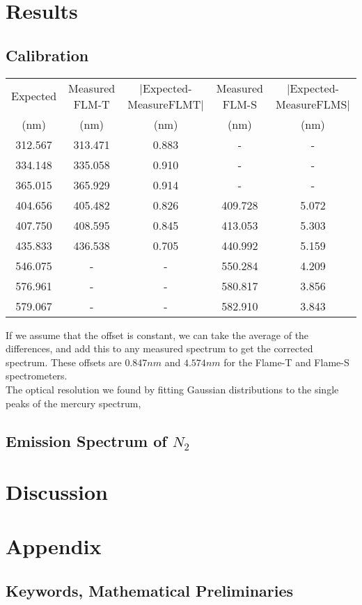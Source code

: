 \documentclass{article}
\begin{document}
\section{Results}
\subsection{Calibration}
\begin{tabular}{c|c|c|c|c}
    \hline
    \hline
    Expected\cite{article2} & Measured FLM-T & |Expected-MeasureFLMT| & Measured FLM-S & |Expected-MeasureFLMS|\\
    (nm)& (nm)& (nm)& (nm)& (nm)\\
    \hline
    312.567 & 313.471 & 0.883 & - & -\\
    334.148 & 335.058 & 0.910 & - & -\\
    365.015 & 365.929 & 0.914 & - & -\\
    404.656 & 405.482 & 0.826 & 409.728 & 5.072 \\
    407.750 & 408.595 & 0.845 & 413.053 & 5.303 \\
    435.833 & 436.538 & 0.705 & 440.992 & 5.159 \\
    546.075 & - & - & 550.284 & 4.209 \\
    576.961 & - & - & 580.817 & 3.856 \\
    579.067 & - & - & 582.910 & 3.843 \\
    \hline
    \hline
\end{tabular}
If we assume that the offset is constant, we can take the average of the differences, and add this to any measured spectrum to get the corrected spectrum. These offsets are $0.847nm$ and $4.574nm$ for the Flame-T and Flame-S spectrometers.\\
\indent The optical resolution we found by fitting Gaussian distributions to the single peaks of the mercury spectrum,

\subsection{Emission Spectrum of $N_2$}
\section{Discussion}
\newpage
\section{Appendix}

\subsection{Keywords, Mathematical Preliminaries}
\end{document}
